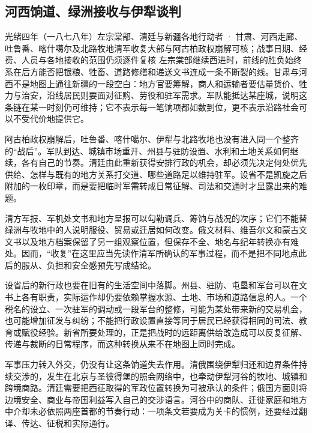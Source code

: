 \subsection{河西饷道、绿洲接收与伊犁谈判}

\begin{event}{}{光绪四年（一八七八年）}{左宗棠部、清廷与新疆各地行动者 · 甘肃、河西走廊、吐鲁番、喀什噶尔及北路牧地}{清军收复大部与阿古柏政权崩解可核；战事日期、经费、人员与各地接收的范围仍须逐件复核}
左宗棠部继续西进时，前线的胜负始终系在后方能否把银粮、牲畜、道路修缮和递送文书连成一条不断裂的线。甘肃与河西不是地图上通往新疆的一段空白：地方官要筹解，商人和运输者要估量货价、牲力与治安，沿线居民则要面对征购、劳役和驻军需求。军队能抵达某座城，说明这条链在某一时刻仍可维持；它不表示每一笔饷项都如数到位，更不表示沿路社会可以不受代价地提供它。

阿古柏政权崩解后，吐鲁番、喀什噶尔、伊犁与北路牧地也没有进入同一个整齐的“战后”。军队到达、城镇市场重开、州县与驻防设置、水利和土地关系如何继续，各有自己的节奏。清廷由此重新获得安排行政的机会，却必须先决定何处优先供给、怎样与既有的地方关系打交道、哪些道路足以维持驻军。设省不是凯旋之后附加的一枚印章，而是要把临时军需转成日常征解、司法和交通时才显露出来的难题。

清方军报、军机处文书和地方呈报可以勾勒调兵、筹饷与战况的次序；它们不能替绿洲与牧地中的人说明服役、贸易或迁居如何改变。俄文材料、维吾尔文和蒙古文文书以及地方档案保留了另一组观察位置，但保存不全、地名与纪年转换亦有难处。因而，“收复”在这里应当先读作清军所确认的军事过程，而不是把不同地点此后的服从、负担和安全感预先写成结论。
\end{event}

设省后的新行政也要在旧有的生活空间中落脚。州县、驻防、屯垦和军台可以在文书上各有职责，实际运作却仍要依赖掌握水源、土地、市场和道路信息的人。一个税名的设立、一次驻军的调动或一段军台的整修，可能为某处带来新的交易机会，也可能增加征发与纠纷；不能把行政设置直接等同于居民已经获得相同的司法、教育或赋役经验。新省所要处理的，正是把战时的远距离供给改造成可以反复征解、传递与裁断的日常程序，而这种转换从来不在地图上同时完成。

军事压力转入外交，仍没有让这条饷道失去作用。清俄围绕伊犁归还和边界条件持续交涉的，发生在北京与圣彼得堡的照会网络中，也牵动伊犁河谷的牧地、城镇和跨境商路。清廷需要把西征取得的军政位置转换为可被承认的条件；俄国方面则将边境安全、商业与帝国利益写入自己的交涉语言。河谷中的商队、迁徙家庭和地方中介却未必依照两座首都的节奏行动：一项条文若要成为关卡的惯例，还要经过翻译、传达、征税和实际通行。

